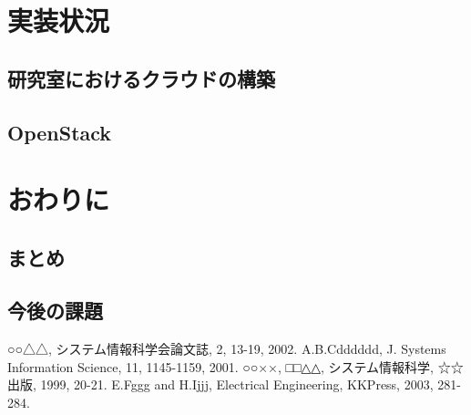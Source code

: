 \section{実装状況}
\subsection{研究室におけるクラウドの構築}
\subsection{OpenStack}

\section{おわりに}
\subsection{まとめ}
\subsection{今後の課題}

\begin{thebibliography}{99}
	○○△△, システム情報科学会論文誌, 2, 13-19, 2002.
	A.B.Cdddddd, J. Systems Information Science, 11, 1145-1159, 2001.
	○○××, □□△△, システム情報科学, ☆☆出版, 1999, 20-21.
	E.Fggg and H.Ijjj, Electrical Engineering, KKPress, 2003, 281-284.
\end{thebibliography}

%
%
